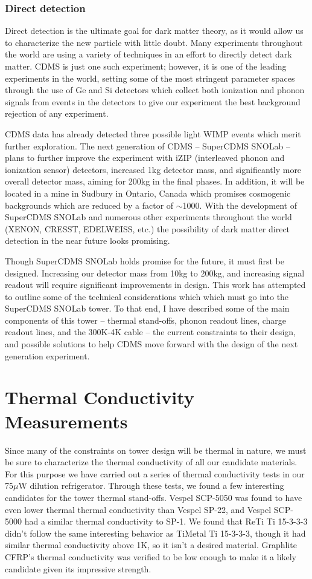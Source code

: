 \documentclass{report}
\begin{document}
\subsubsection{Direct detection}
Direct detection is the ultimate goal for dark matter theory, as it would allow us to characterize the new particle with little doubt. Many experiments throughout the world are using a variety of techniques in an effort to directly detect dark matter. CDMS is just one such experiment; however, it is one of the leading experiments in the world, setting some of the most stringent parameter spaces through the use of Ge and Si detectors which collect both ionization and phonon signals from events in the detectors to give our experiment the best background rejection of any experiment.

CDMS data has already detected three possible light WIMP events which merit further exploration. The next generation of CDMS -- SuperCDMS SNOLab -- plans to further improve the experiment with iZIP (interleaved phonon and ionization sensor) detectors, increased 1kg detector mass, and significantly more overall detector mass, aiming for 200kg in the final phases. In addition, it will be located in a mine in Sudbury in Ontario, Canada which promises cosmogenic backgrounds which are reduced by a factor of $\sim$1000. With the development of SuperCDMS SNOLab and numerous other experiments throughout the world (XENON, CRESST, EDELWEISS, etc.) the possibility of dark matter direct detection in the near future looks promising.

Though SuperCDMS SNOLab holds promise for the future, it must first be designed. Increasing our detector mass from 10kg to 200kg, and increasing signal readout will require significant improvements in design. This work has attempted to outline some of the technical considerations which which must go into the SuperCDMS SNOLab tower. To that end, I have described some of the main components of this tower -- thermal stand-offs, phonon readout lines, charge readout lines, and the 300K-4K cable -- the current constraints to their design, and possible solutions to help CDMS move forward with the design of the next generation experiment.

\section{Thermal Conductivity Measurements}

Since many of the constraints on tower design will be thermal in nature, we must be sure to characterize the thermal conductivity of all our candidate materials. For this purpose we have carried out a series of thermal conductivity tests in our 75$\mu$W dilution refrigerator. Through these tests, we found a few interesting candidates for the tower thermal stand-offs. Vespel SCP-5050 was found to have even lower thermal thermal conductivity than Vespel SP-22, and Vespel SCP-5000 had a similar thermal conductivity to SP-1. We found that ReTi Ti 15-3-3-3 didn't follow the same interesting behavior as TiMetal Ti 15-3-3-3, though it had similar thermal conductivity above 1K, so it isn't a desired material. Graphlite CFRP's thermal conductivity was verified to be low enough to make it a likely candidate given its impressive strength.
\end{document}
